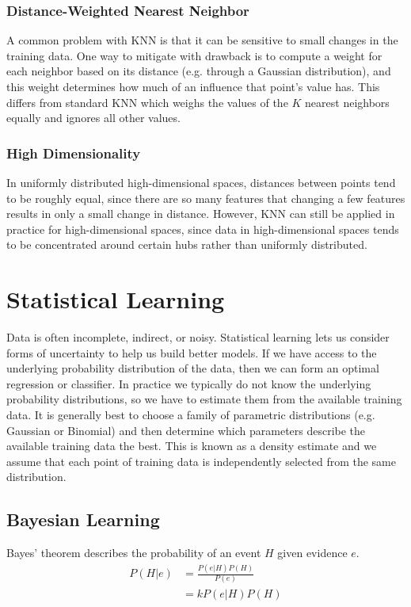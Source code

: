 \documentclass[12pt]{article}
\begin{document}
        \subsubsection{Distance-Weighted Nearest Neighbor}
            A common problem with KNN is that it can be sensitive to small changes in the training data. One way to mitigate with drawback is to compute a weight for
            each neighbor based on its distance (e.g. through a Gaussian distribution), and this weight determines how much of an influence that point's value has.
            This differs from standard KNN which weighs the values of the $K$ nearest neighbors equally and ignores all other values.

        \subsubsection{High Dimensionality}
            In uniformly distributed high-dimensional spaces, distances between points tend to be roughly equal, since there are so many features that changing a few
            features results in only a small change in distance. However, KNN can still be applied in practice for high-dimensional spaces, since data in high-dimensional
            spaces tends to be concentrated around certain hubs rather than uniformly distributed.

\section{Statistical Learning}
    Data is often incomplete, indirect, or noisy. Statistical learning lets us consider forms of uncertainty to help us build better models. If we have access to the underlying probability distribution of the data, then we can form 
    an optimal regression or classifier. In practice we typically do not know the underlying probability distributions, so we have to estimate them from the available training data. It is generally best to choose a family of parametric
    distributions (e.g. Gaussian or Binomial) and then determine which parameters describe the available training data the best. This is known as a density estimate and we assume that each point of training data is independently selected
    from the same distribution.

    \subsection{Bayesian Learning}
    Bayes' theorem describes the probability of an event $H$ given evidence $e$.
    \begin{align}
        P(H|e) &= \frac{P(e|H)P(H)}{P(e)} \\
        &= kP(e|H)P(H)
    \end{align}
\end{document}
